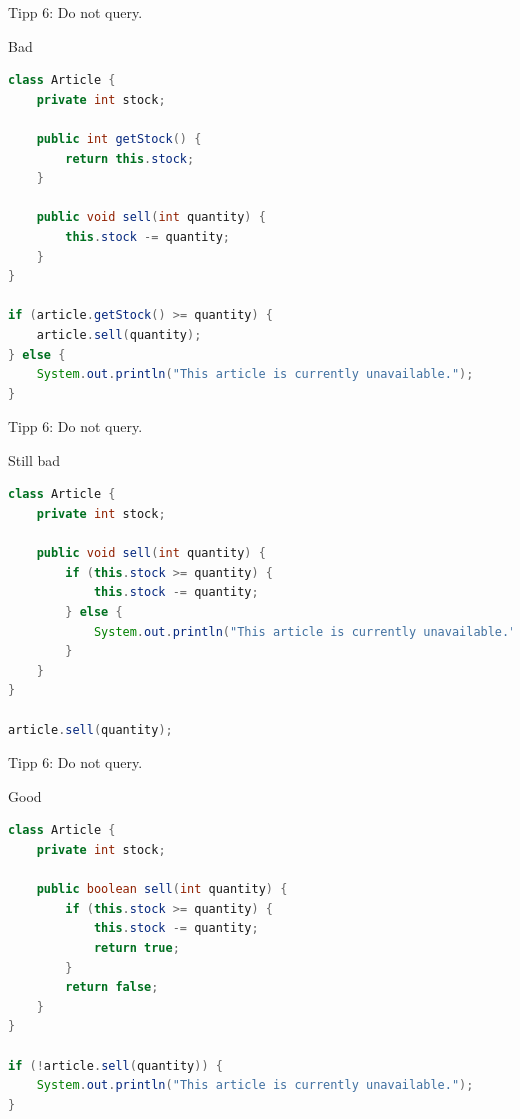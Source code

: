 \documentclass[18pt]{beamer}
\begin{document}
\begin{frame}[fragile]{Tipp 6: Do not query.}
    \begin{alertblock}{Bad}
        \begin{lstlisting}[language=Java,basicstyle=\scriptsize]
class Article {
    private int stock;

    public int getStock() {
        return this.stock;
    }

    public void sell(int quantity) {
        this.stock -= quantity;
    }
}

if (article.getStock() >= quantity) {
    article.sell(quantity);
} else {
    System.out.println("This article is currently unavailable.");
}
        \end{lstlisting}
    \end{alertblock}
\end{frame}

\begin{frame}[fragile]{Tipp 6: Do not query.}
    \begin{alertblock}{Still bad}
        \begin{lstlisting}[language=Java,basicstyle=\scriptsize]
class Article {
    private int stock;

    public void sell(int quantity) {
        if (this.stock >= quantity) {
            this.stock -= quantity;
        } else {
            System.out.println("This article is currently unavailable.");
        }
    }
}

article.sell(quantity);
        \end{lstlisting}
    \end{alertblock}
\end{frame}

\begin{frame}[fragile]{Tipp 6: Do not query.}
    \begin{exampleblock}{Good}
        \begin{lstlisting}[language=Java,basicstyle=\scriptsize]
class Article {
    private int stock;

    public boolean sell(int quantity) {
        if (this.stock >= quantity) {
            this.stock -= quantity;
            return true;
        }
        return false;
    }
}

if (!article.sell(quantity)) {
    System.out.println("This article is currently unavailable.");
}
        \end{lstlisting}
    \end{exampleblock}
\end{frame}
\end{document}
